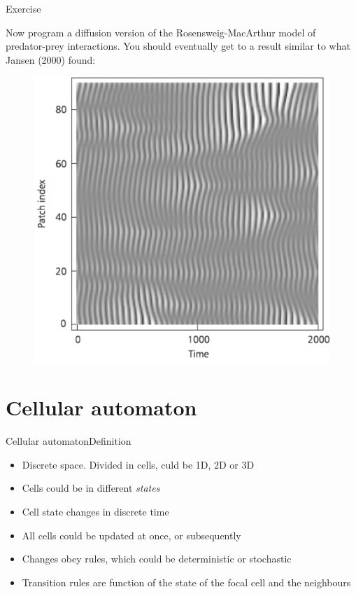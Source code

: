 \documentclass{eecslides}
\begin{document}
	\begin{frame}{Exercise}

		Now program a diffusion version of the Rosensweig-MacArthur model of predator-prey interactions. You should eventually get to a result similar to what Jansen (2000) found:\\

		\begin{figure}[!t]
			\includegraphics[height=0.55\textheight]{Jansen2000}
		\end{figure}

	\end{frame}


	\section{Cellular automaton}

	\begin{frame}{Cellular automaton}{Definition}

	\begin{itemize}
		\item Discrete space. Divided in cells, culd be 1D, 2D or 3D
		\item Cells could be in different \emph{states}
		\item Cell state changes in discrete time
		\item All cells could be updated at once, or subsequently	
		\item Changes obey rules, which could be deterministic or stochastic
		\item Transition rules are function of the state of the focal cell and the neighbours
	\end{itemize}
	\end{frame}
\end{document}
